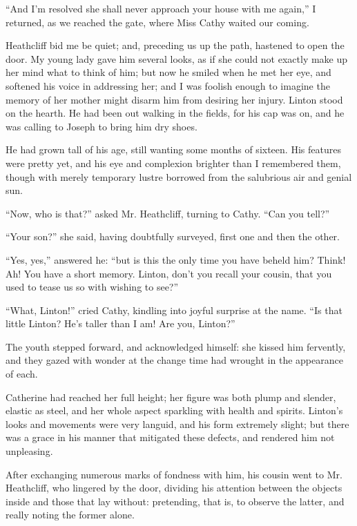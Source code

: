 \par “And I'm resolved she shall never approach your house with me again,” I returned, as we reached the gate, where Miss Cathy waited our coming.
\par Heathcliff bid me be quiet; and, preceding us up the path, hastened to open the door. My young lady gave him several looks, as if she could not exactly make up her mind what to think of him; but now he smiled when he met her eye, and softened his voice in addressing her; and I was foolish enough to imagine the memory of her mother might disarm him from desiring her injury. Linton stood on the hearth. He had been out walking in the fields, for his cap was on, and he was calling to Joseph to bring him dry shoes.
\par He had grown tall of his age, still wanting some months of sixteen. His features were pretty yet, and his eye and complexion brighter than I remembered them, though with merely temporary lustre borrowed from the salubrious air and genial sun.
\par “Now, who is that?” asked Mr. Heathcliff, turning to Cathy. “Can you tell?”
\par “Your son?” she said, having doubtfully surveyed, first one and then the other.
\par “Yes, yes,” answered he: “but is this the only time you have beheld him? Think! Ah! You have a short memory. Linton, don't you recall your cousin, that you used to tease us so with wishing to see?”
\par “What, Linton!” cried Cathy, kindling into joyful surprise at the name. “Is that little Linton? He's taller than I am! Are you, Linton?”
\par The youth stepped forward, and acknowledged himself: she kissed him fervently, and they gazed with wonder at the change time had wrought in the appearance of each.
\par Catherine had reached her full height; her figure was both plump and slender, elastic as steel, and her whole aspect sparkling with health and spirits. Linton's looks and movements were very languid, and his form extremely slight; but there was a grace in his manner that mitigated these defects, and rendered him not unpleasing.
\par After exchanging numerous marks of fondness with him, his cousin went to Mr. Heathcliff, who lingered by the door, dividing his attention between the objects inside and those that lay without: pretending, that is, to observe the latter, and really noting the former alone.
